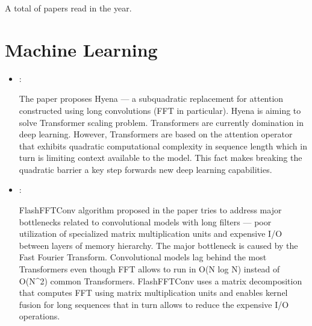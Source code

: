 



A total of  papers read in the year.


\section*{Machine Learning}
\begin{itemize}
    \item \cite{Poli:Hyena:2023}:

    The paper proposes Hyena --- a subquadratic replacement for attention constructed using long convolutions (FFT in particular). Hyena is aiming to solve Transformer scaling problem. Transformers are currently domination in deep learning. However, Transformers are based on the attention operator that exhibits quadratic computational complexity in sequence length which in turn is limiting context available to the model. This fact makes breaking the quadratic barrier a key step forwards new deep learning capabilities.

    \item \cite{Fu:FlashFFTConv:2024}:

    FlashFFTConv algorithm proposed in the paper tries to address major bottlenecks related to convolutional models with long filters --- poor utilization of specialized matrix multiplication units and expensive I/O between layers of memory hierarchy. The major bottleneck is caused by the Fast Fourier Transform. Convolutional models lag behind the most Transformers even though FFT allows to run in O(N log N) instead of  O(N^2) common Transformers. FlashFFTConv uses a matrix decomposition that computes FFT using matrix multiplication units and enables kernel fusion for long sequences that in turn allows to reduce the expensive I/O operations.
\end{itemize}

